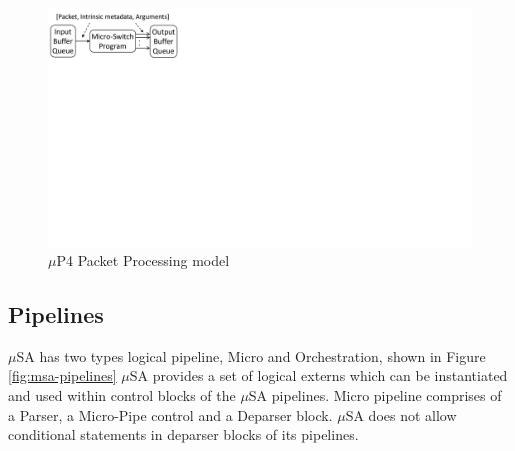


\begin{figure}
    \centering
    \includegraphics[trim=0 420 667 0, clip, scale=0.5]{microp4-program-model}
    \caption{$\mu$P4 Packet Processing model}
    \label{fig:mp4-packet-processing-model}
\end{figure}

\subsection{Pipelines}
\label{subsection:pipelines}
$\mu$SA has two types logical pipeline, Micro and Orchestration, shown in Figure \ref{fig:msa-pipelines}
$\mu$SA provides a set of logical externs which can be instantiated and used within control blocks of the $\mu$SA pipelines.
Micro pipeline comprises of a Parser, a Micro-Pipe control and a Deparser block.
$\mu$SA does not allow conditional statements in deparser blocks of its pipelines.

